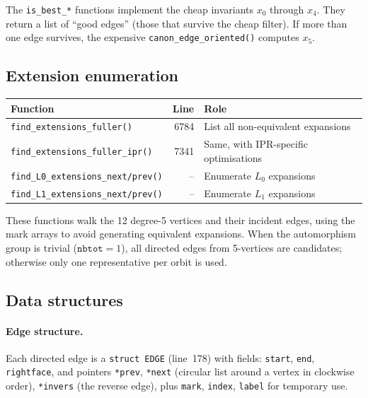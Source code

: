 \documentclass[11pt,a4paper]{article}
\theoremstyle{definition}
\begin{document}
The \texttt{is\_best\_*} functions implement the cheap invariants $x_0$
through $x_4$.  They return a list of ``good edges'' (those that survive
the cheap filter).  If more than one edge survives, the expensive
\texttt{canon\_edge\_oriented()} computes $x_5$.

\subsection{Extension enumeration}

\begin{center}
\begin{tabular}{lrl}
Function & Line & Role \\
\hline
\texttt{find\_extensions\_fuller()} & 6784 & List all non-equivalent expansions \\
\texttt{find\_extensions\_fuller\_ipr()} & 7341 & Same, with IPR-specific optimisations \\
\texttt{find\_L0\_extensions\_next/prev()} & -- & Enumerate $L_0$ expansions \\
\texttt{find\_L1\_extensions\_next/prev()} & -- & Enumerate $L_1$ expansions \\
\end{tabular}
\end{center}

These functions walk the 12 degree-5 vertices and their incident edges,
using the mark arrays to avoid generating equivalent expansions.  When
the automorphism group is trivial ($\texttt{nbtot} = 1$), all directed
edges from 5-vertices are candidates; otherwise only one representative
per orbit is used.

\subsection{Data structures}

\paragraph{Edge structure.}
Each directed edge is a \texttt{struct EDGE} (line~178) with fields:
\texttt{start}, \texttt{end}, \texttt{rightface}, and pointers
\texttt{*prev}, \texttt{*next} (circular list around a vertex in
clockwise order), \texttt{*invers} (the reverse edge), plus
\texttt{mark}, \texttt{index}, \texttt{label} for temporary use.
\end{document}
